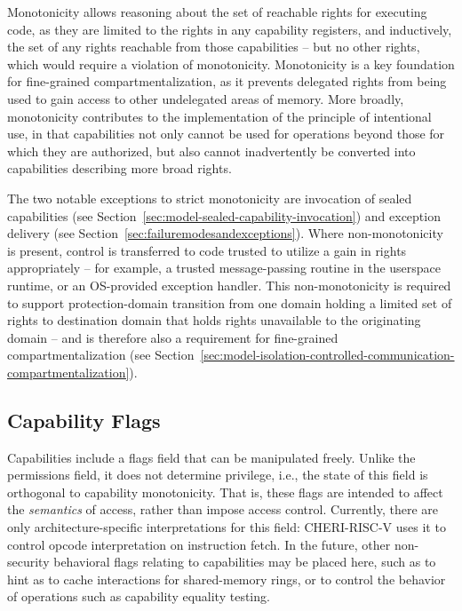 Monotonicity allows reasoning about the set of reachable rights for executing
code, as they are limited to the rights in any capability registers, and
inductively, the set of any rights reachable from those capabilities -- but no
other rights, which would require a violation of monotonicity.
Monotonicity is a key foundation for fine-grained compartmentalization, as it
prevents delegated rights from being used to gain access to other undelegated
areas of memory.
More broadly, monotonicity contributes to the implementation of the principle
of intentional use, in that capabilities not only cannot be used for
operations beyond those for which they are authorized, but also cannot
inadvertently be converted into capabilities describing more broad rights.

The two notable exceptions to strict monotonicity
 are invocation of sealed
capabilities (see Section~\ref{sec:model-sealed-capability-invocation}) and
exception delivery (see Section~\ref{sec:failuremodesandexceptions}).
Where non-monotonicity is present, control is transferred to code trusted to
utilize a gain in rights appropriately -- for example, a trusted
message-passing routine in the userspace runtime, or an OS-provided exception
handler.
This non-monotonicity is required to support protection-domain transition from
one domain holding a limited set of rights to destination domain that holds
rights unavailable to the originating domain -- and is therefore also
a requirement for fine-grained compartmentalization (see
Section~\ref{sec:model-isolation-controlled-communication-compartmentalization}).


\subsection{Capability Flags}
\label{sec:model-flags}
Capabilities include a flags field that can be manipulated freely.
Unlike the permissions field, it does not determine privilege, i.e., the state
of this field is orthogonal to capability monotonicity.
%
That is, these flags are intended to affect the \emph{semantics} of access,
rather than impose access control.
%
Currently, there are only architecture-specific interpretations for this
field: CHERI-RISC-V uses it to control opcode interpretation on instruction
fetch.
In the future, other non-security behavioral flags relating to capabilities may
be placed here, such
as to hint as to cache interactions for shared-memory rings, or to control
the behavior of operations such as capability equality testing.

